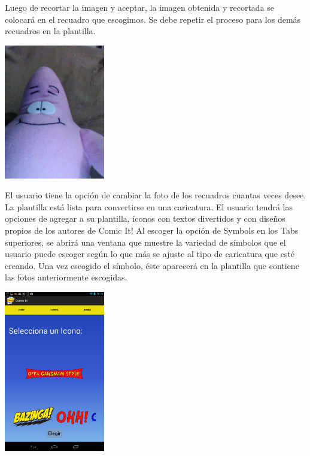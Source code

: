 \documentclass[12pt]{report}
\begin{document}
\newpage
Luego de recortar la imagen y aceptar, la imagen obtenida y recortada se colocará en el recuadro que escogimos. Se debe repetir el proceso para los demás recuadros en la plantilla.
\newline
	\begin{center}
		\begingroup
			\includegraphics[width=0.33\textwidth]{imagenes_usuario/foto.jpg}
		\endgroup
	\end{center}


El usuario tiene la opción de cambiar la foto de los recuadros cuantas veces desee.
La plantilla está lista para convertirse en una caricatura.
El usuario tendrá las opciones de agregar a su plantilla, íconos con textos divertidos  y con diseños propios de los autores de Comic It!
Al escoger la opción de Symbols en los Tabs superiores, se abrirá una ventana que muestre la variedad de símbolos que el usuario puede escoger según lo que más se ajuste al tipo de caricatura que esté creando. Una vez escogido el símbolo, éste aparecerá en la plantilla que contiene las fotos anteriormente escogidas.
\newline

	\begin{center}
		\begingroup
			\includegraphics[width=0.33\textwidth]{imagenes_usuario/iconos.png}
		\endgroup
	\end{center}
\end{document}
